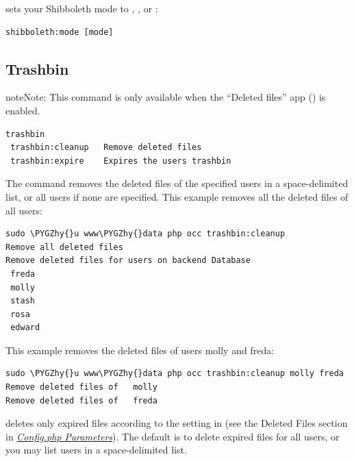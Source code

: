 \documentclass[letterpaper,10pt,english]{sphinxmanual}
\def\PYGZhy{\char`\-}
\begin{document}
 sets your Shibboleth mode to ,
, or :

\begin{Verbatim}[commandchars=\\\{\}]
shibboleth:mode [mode]
\end{Verbatim}


\subsection{Trashbin}
\label{configuration_server/occ_command:trashbin-label}\label{configuration_server/occ_command:trashbin}
\begin{notice}{note}{Note:}
This command is only available when the ``Deleted files'' app
() is enabled.
\end{notice}

\begin{Verbatim}[commandchars=\\\{\}]
trashbin
 trashbin:cleanup   Remove deleted files
 trashbin:expire    Expires the users trashbin
\end{Verbatim}

The  command removes the deleted files of the specified
users in a space-delimited list, or all users if none are specified. This example removes all the deleted files of all users:

\begin{Verbatim}[commandchars=\\\{\}]
sudo \PYGZhy{}u www\PYGZhy{}data php occ trashbin:cleanup
Remove all deleted files
Remove deleted files for users on backend Database
 freda
 molly
 stash
 rosa
 edward
\end{Verbatim}

This example removes the deleted files of users molly and freda:

\begin{Verbatim}[commandchars=\\\{\}]
sudo \PYGZhy{}u www\PYGZhy{}data php occ trashbin:cleanup molly freda
Remove deleted files of   molly
Remove deleted files of   freda
\end{Verbatim}

 deletes only expired files according to the  setting in  (see the Deleted Files section in {\hyperref[configuration_server/config_sample_php_parameters::doc]{\emph{Config.php Parameters}}}). The default is to delete expired files for all users, or you may list users in a space-delimited list.
\end{document}

